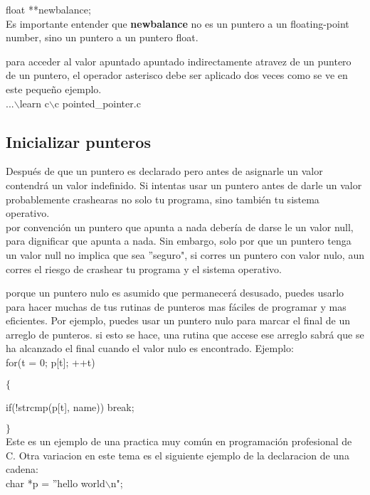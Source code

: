 \documentclass[]{article}
\begin{document}
	float **newbalance;\\
	
	Es importante entender que \textbf{newbalance} no es un puntero a un floating-point number, sino un puntero a un puntero float.
	
	para acceder al valor apuntado apuntado indirectamente atravez de un puntero de un puntero, el operador asterisco debe ser aplicado dos veces como se ve en este pequeño ejemplo.\\
	
	...$\backslash$learn c$\backslash$c pointed\_pointer.c\\
	
	\subsection{Inicializar punteros}
	
	Después de que un puntero es declarado pero antes de asignarle un valor contendrá un valor indefinido. Si intentas usar un puntero antes de darle un valor probablemente crashearas no solo tu programa, sino también tu sistema operativo.\\
	
	por convención un puntero que apunta a nada debería de darse le un valor null, para dignificar que apunta a nada. Sin embargo, solo por que un puntero tenga un valor null no implica que sea ''seguro", si corres un puntero con valor nulo, aun corres el riesgo de crashear tu programa y el sistema operativo.
	
	porque un puntero nulo es asumido que permanecerá desusado, puedes usarlo para hacer muchas de tus rutinas de punteros mas fáciles de programar y mas eficientes. Por ejemplo, puedes usar un puntero nulo para marcar el final de un arreglo de punteros. si esto se hace, una rutina que accese ese arreglo sabrá que se ha alcanzado el final cuando el valor nulo es encontrado. Ejemplo:\\
	
	for(t = 0; p[t]; ++t)
	
	$\lbrace$
	
	if(!strcmp(p[t], name)) break;
	
	$\rbrace$\\
	
	Este es un ejemplo de una practica muy común en programación profesional de C. Otra variacion en este tema es el siguiente ejemplo de la declaracion de una cadena:\\
	
	char *p = ''hello world$\backslash$n";\\
	
\end{document}
